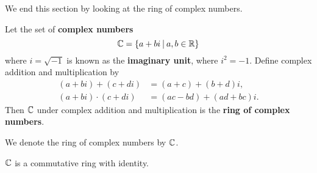 We end this section by looking at the ring of complex numbers.
\begin{definition}
    Let the set of \textbf{complex numbers}
    \[
        \C = \{a + bi \vert a, b \in \R\}
    \]
    where $i = \sqrt{-1}$ is known as the \textbf{imaginary unit}, where $i^2 = -1$. Define complex addition and multiplication by
    \begin{align*}
        (a+bi) + (c+di) &= (a+c) + (b+d)i,\\
        (a+bi) \cdot (c+di) &= (ac-bd) + (ad+bc)i.
    \end{align*}
    Then $\mathbb{C}$ under complex addition and multiplication is the \textbf{ring of complex numbers}.
\end{definition}
\begin{remark}
    We denote the ring of complex numbers by $\mathbb{C}$.
\end{remark}
\begin{proposition}
    $\mathbb{C}$ is a commutative ring with identity.
\end{proposition}
